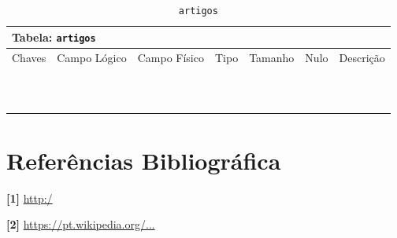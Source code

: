 \documentclass[12pt,a4paper]{article}
\begin{document}
\begin{center}
\begin{table}[h!]
	\caption{\texttt{artigos}}
	\label{tabela:artigos}
	\begin{tabular}{|p{1cm}|p{1.5cm}|p{1.25cm}|p{1.25cm}|p{1.75cm}|p{1.25cm}|p{4.5cm}|}\hline	
		\multicolumn{7}{|p{16cm}|}{\cellcolor{cinzaClaro}  \centering Tabela: \texttt{artigos}} \\ \hline %
		{\small Chaves} & {\small Campo Lógico} & {\small Campo Físico} & {\small Tipo} & {\small Tamanho} & {\small Nulo} & {\small Descrição}\\\hline %
		
		{\tiny } & {\tiny } & {\tiny } & {\tiny } & {\tiny } & {\tiny } &{\tiny }\\\hline
		{\tiny } & {\tiny } & {\tiny } & {\tiny } & {\tiny } & {\tiny } &{\tiny }\\\hline
		{\tiny } & {\tiny } & {\tiny } & {\tiny } & {\tiny } & {\tiny } &{\tiny }\\\hline
		{\tiny } & {\tiny } & {\tiny } & {\tiny } & {\tiny } & {\tiny } &{\tiny }\\\hline
		{\tiny } & {\tiny } & {\tiny } & {\tiny } & {\tiny } & {\tiny } &{\tiny }\\\hline
		{\tiny } & {\tiny } & {\tiny } & {\tiny } & {\tiny } & {\tiny } &{\tiny }\\\hline
		{\tiny } & {\tiny } & {\tiny } & {\tiny } & {\tiny } & {\tiny } &{\tiny }\\\hline
		{\tiny } & {\tiny } & {\tiny } & {\tiny } & {\tiny } & {\tiny } &{\tiny }\\\hline
		{\tiny } & {\tiny } & {\tiny } & {\tiny } & {\tiny } & {\tiny } &{\tiny }\\\hline
		{\tiny } & {\tiny } & {\tiny } & {\tiny } & {\tiny } & {\tiny } &{\tiny }\\\hline
		{\tiny } & {\tiny } & {\tiny } & {\tiny } & {\tiny } & {\tiny } &{\tiny }\\\hline
		
			
	\end{tabular}
\end{table}	
\end{center}


\section{Referências Bibliográfica}
\noindent \textbf{[1]} \url {http:/}\\\vspace{0.2cm}

\noindent \textbf{[2] }\url{https://pt.wikipedia.org/...}\\\vspace{0.2cm}
\end{document}
